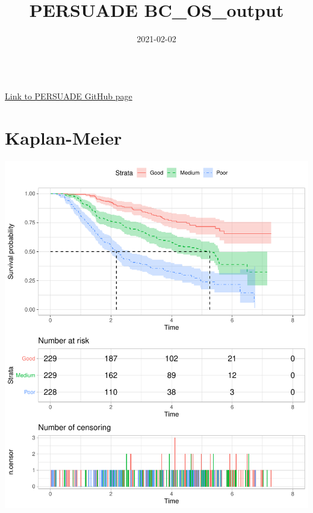 \documentclass[]{article}
\title{PERSUADE BC\_OS\_output}
\author{}
\date{\vspace{-2.5em}2021-02-02}
\begin{document}
\maketitle

{
\hypersetup{linkcolor=black}
\setcounter{tocdepth}{2}
\tableofcontents
}
~\\
\href{https://github.com/Bram-R/PERSUADE}{Link to PERSUADE GitHub page}
\newpage

\section{Kaplan-Meier}\label{kaplan-meier}

\begin{flushleft}\includegraphics{Images/plot_KM-1} \end{flushleft}
\end{document}

